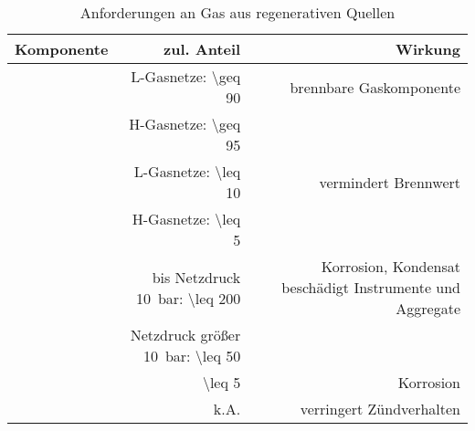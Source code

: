 {
\renewcommand{\arraystretch}{1.1}
\begin{table}[H]
	\begin{center}
		\caption{Anforderungen an Gas aus regenerativen Quellen \parencite{FNR14}\parencite{KoBi16}}
		\begin{tabu} to 0.5\textwidth {| X[0.6] | R | R |}
\hline
			Komponente  &	zul. Anteil  & Wirkung					\\		
\hline
			 &	L-Gasnetze: \SI{\geq 90}{\Molpercent}  &	brennbare Gaskomponente	\\
			{}		 &	H-Gasnetze: \SI{\geq 95}{\Molpercent}	&	{}							\\ 
\hline

			  	&	L-Gasnetze: \SI{\leq 10}{\Molpercent}  &	vermindert Brennwert	\\
			{}			&	H-Gasnetze: \SI{\leq 5}{\Molpercent}	 &	{}						\\ 

\hline
			     	&	bis Netzdruck \SI{10}{\bar}: \SI{\leq 200}{\mgcubm}	&	Korrosion, Kondensat beschädigt Instrumente und Aggregate	\\
			{}			&	Netzdruck größer \SI{10}{\bar}: \SI{\leq 50}{\mgcubm}	& {}	\\ 
\hline
			  	&	\SI{\leq 5}{\mgcubm}  	&	Korrosion			\\
\hline
			  	&	k.A.  	&	verringert Zündverhalten			\\
\hline
			
		\end{tabu}
		\label{tab:tab_gasgrid_spec}
	\end{center}
\end{table}
}